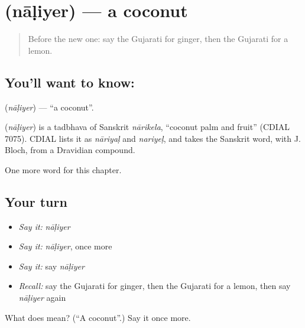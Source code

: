 \section[\texorpdfstring{\gu{નાળિયેર} (nāḷiyer)}{નાળિયેર (nāḷiyer)}]{ (nāḷiyer) — a coconut}

\label{lesson:GU-C115-naliyer}



\begin{quote}
Before the new one: say the Gujarati for ginger, then the Gujarati for a lemon.
\end{quote}

\subsection*{You'll want to know: }
\textbf{} (\emph{nāḷiyer}) — \textquotedblleft{}a coconut\textquotedblright{}.

\begin{cousinweb}
\textbf{} (\emph{nāḷiyer}) is a tadbhava of Sanskrit \emph{nārikela}, \textquotedblleft{}coconut palm and fruit\textquotedblright{} (CDIAL 7075). CDIAL lists it as \emph{nāriyaḷ} and \emph{nariyeḷ}, and takes the Sanskrit word, with J. Bloch, from a Dravidian compound.
\end{cousinweb}

\begin{grammarlens}[title={What you've built}]
One more word for this chapter.
\end{grammarlens}

\subsection*{Your turn}
\begin{itemize}
\raggedright
  \item \emph{Say it:} \emph{nāḷiyer}
  \item \emph{Say it:} \emph{nāḷiyer}, once more
  \item \emph{Say it:} say \emph{nāḷiyer}
  \item \emph{Recall:} say the Gujarati for ginger, then the Gujarati for a lemon, then say \emph{nāḷiyer} again
\end{itemize}

\begin{tcolorbox}[breakable,colback=teal!4,colframe=teal!35!black,title={Before you move on}]
What does  mean? (\textquotedblleft{}A coconut\textquotedblright{}.) Say it once more.
\end{tcolorbox}

